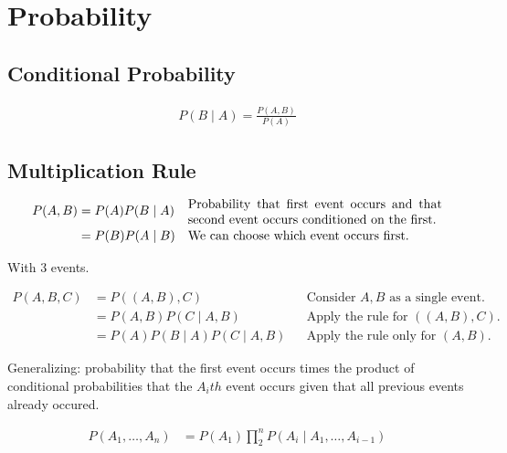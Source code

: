 \documentclass{article}
\newcommand{\given}{\mid}
\begin{document}
\section{Probability}

\subsection{Conditional Probability}

\begin{align*}
    P(B \given A) = \frac{P(A,B)}{P(A)}
\end{align*}

\subsection{Multiplication Rule}

\begin{align*}
    P(A,B) &= P(A) P(B \given A) && \parbox{7cm}{Probability that first event occurs and 
                                    that second event occurs conditioned on the first.} \\
           &= P(B) P(A \given B) && \text{We can choose which event occurs first.}
\end{align*}

With 3 events.

\begin{align*}
    P(A,B,C) &= P((A,B),C) && \text{Consider $A,B$ as a single event.} \\
             &= P(A,B) P(C \given A,B) && \text{Apply the rule for $((A,B),C)$.} \\
             &= P(A) P(B \given A) P(C \given A,B) && \text{Apply the rule only for $(A,B)$.}
\end{align*}

Generalizing: probability that the first event occurs times the product of conditional probabilities that the $A_ith$ event occurs given that all previous events already occured.

\begin{align*}
    P(A_1,\dots,A_n) &= P(A_1) \prod_2^n P(A_i \given A_1,\dots,A_{i-1})
\end{align*}
\end{document}
